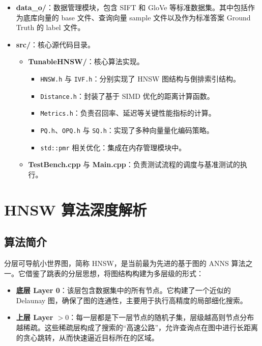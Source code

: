 \documentclass{article}
\begin{document}
\begin{itemize}
    \item \textbf{data\_o/}：数据管理模块，包含 SIFT 和 GloVe 等标准数据集。其中包括作为底库向量的 base 文件、查询向量 sample 文件以及作为标准答案 Ground Truth 的 label 文件。
    \item \textbf{src/}：核心源代码目录。
    \begin{itemize}
        \item \textbf{TunableHNSW/}：核心算法实现。
        \begin{itemize}
            \item \texttt{HNSW.h} 与 \texttt{IVF.h}：分别实现了 HNSW 图结构与倒排索引结构。
            \item \texttt{Distance.h}：封装了基于 SIMD 优化的距离计算函数。
            \item \texttt{Metrics.h}：负责召回率、延迟等关键性能指标的计算。
            \item \texttt{PQ.h}、\texttt{OPQ.h} 与 \texttt{SQ.h}：实现了多种向量量化编码策略。
            \item \texttt{std::pmr} 相关优化：集成在内存管理模块中。
        \end{itemize}
        \item \textbf{TestBench.cpp} 与 \textbf{Main.cpp}：负责测试流程的调度与基准测试的执行。
    \end{itemize}
\end{itemize}

\section{HNSW 算法深度解析}

\subsection{算法简介}

分层可导航小世界图，简称 HNSW，是当前最为先进的基于图的 ANNS 算法之一。它借鉴了跳表的分层思想，将图结构构建为多层级的形式：

\begin{itemize}
    \item \textbf{底层 Layer 0}：该层包含数据集中的所有节点。它构建了一个近似的 Delaunay 图，确保了图的连通性，主要用于执行高精度的局部细化搜索。
    \item \textbf{上层 Layer $>0$}：每一层都是下一层节点的随机子集，层级越高则节点分布越稀疏。这些稀疏层构成了搜索的“高速公路”，允许查询点在图中进行长距离的贪心跳转，从而快速逼近目标所在的区域。
\end{itemize}
\end{document}

